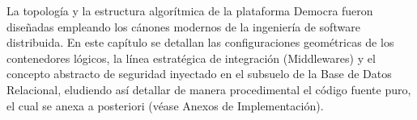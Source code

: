 La topolog\'ia y la estructura algor\'itmica de la plataforma Democra fueron dise\~nadas empleando los c\'anones modernos de la ingenier\'ia de software distribuida. En este cap\'itulo se detallan las configuraciones geom\'etricas de los contenedores l\'ogicos, la l\'inea estrat\'egica de integraci\'on (Middlewares) y el concepto abstracto de seguridad inyectado en el subsuelo de la Base de Datos Relacional, eludiendo as\'i detallar de manera procedimental el c\'odigo fuente puro, el cual se anexa a posteriori (v\'ease Anexos de Implementaci\'on).
